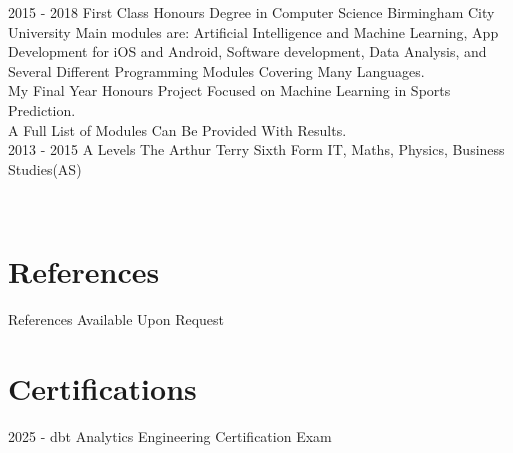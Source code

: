 \documentclass[]{friggeri-cv}
\begin{document}
\begin{entrylist}
  \entry
    {2015 - 2018}
    {First Class Honours Degree in Computer Science}
    {Birmingham City University}
    {Main modules are: Artificial Intelligence and Machine Learning, App Development for iOS and Android, Software development, Data Analysis, and Several Different Programming Modules Covering Many Languages.
    \\ My Final Year Honours Project Focused on Machine Learning in Sports Prediction. 
    \\ A Full List of Modules Can Be Provided With Results.\\}
    \entry
    {2013 - 2015}
    {A Levels}
    {The Arthur Terry Sixth Form}
    {IT, Maths, Physics, Business Studies(AS)\\}
\end{entrylist}
\\

\section{References}
References Available Upon Request
\\

\section{Certifications}
2025 - dbt Analytics Engineering Certification Exam
\end{document}
